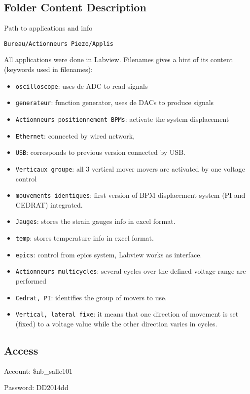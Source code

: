 \subsection{Folder Content Description}\par
Path to applications and info\par
\verb?Bureau/Actionneurs Piezo/Applis?\par
All applications were done in Labview. Filenames gives a hint of its content (keywords used in filenames):\par
\begin{itemize}
\item \verb?oscilloscope?: uses de ADC to read signals
\item \verb?generateur?: function generator, uses de DACs to produce signals
\item \verb?Actionneurs positionnement BPMs?: activate the system displacement
\item \verb?Ethernet?: connected by wired network,
\item \verb?USB?: corresponds to previous version connected by USB.
\item \verb?Verticaux groupe?: all 3 vertical mover movers are activated by one voltage control
\item \verb?mouvements identiques?: first version of BPM displacement system (PI and CEDRAT) integrated.
\item \verb?Jauges?: stores the strain gauges info in excel format.
\item \verb?temp?: stores temperature info in excel format.
\item \verb?epics?: control from epics system, Labview works as interface.
\item \verb?Actionneurs multicycles?: several cycles over the defined voltage range are performed
\item \verb?Cedrat, PI?: identifies the group of movers to use.
\item \verb?Vertical, lateral fixe?: it means that one direction of movement is set (fixed) to a voltage value while the other direction varies in cycles.
\end{itemize}

\subsection{Access}
Account: \$nb\_salle101\par
Password: DD2014dd\par

